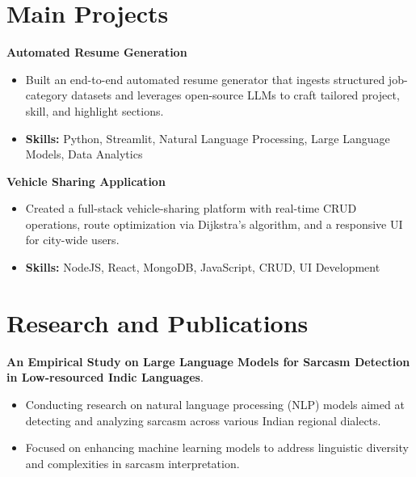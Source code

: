 \documentclass[a4paper,11pt]{article}
\begin{document}
\section{\textbf{Main Projects}}

\vspace{1mm}
  \textbf{Automated Resume Generation  }
\vspace{-1.5mm} %
\begin{itemize}
  \item Built an end-to-end automated resume generator that ingests structured job-category datasets and leverages open-source LLMs to craft tailored project, skill, and highlight sections.
\vspace{-3mm}
  \item \textbf{Skills:} Python, Streamlit, Natural Language Processing, Large Language Models, Data Analytics
\end{itemize}


\vspace{1mm}
   \textbf{Vehicle Sharing Application }
\vspace{-1.5mm} %
\begin{itemize}
  \item Created a full-stack vehicle-sharing platform with real-time CRUD operations, route optimization via Dijkstra's algorithm, and a responsive UI for city-wide users.
\vspace{-3mm}
  \item \textbf{Skills:} NodeJS, React, MongoDB, JavaScript, CRUD, UI Development
\end{itemize}



\section{\textbf{Research and Publications} \hfill }
\vspace{1mm}
  \textbf{An Empirical Study on Large Language Models for Sarcasm Detection in Low-resourced Indic Languages}.
\vspace{-1mm} %
\begin{itemize}
  \item Conducting research on natural language processing (NLP) models aimed at detecting and analyzing sarcasm across various Indian regional dialects.
\vspace{-3mm}
  \item Focused on enhancing machine learning models to address linguistic diversity and complexities in sarcasm interpretation.
\end{itemize}
\end{document}
